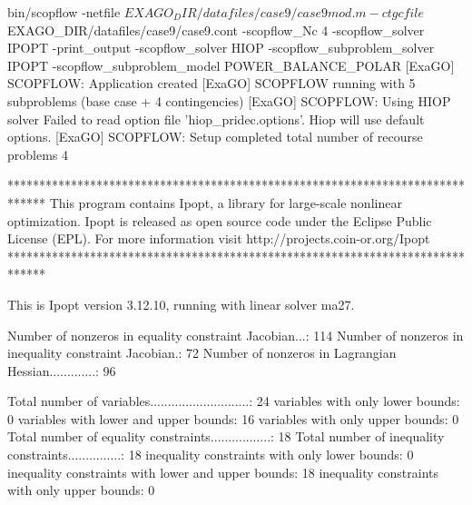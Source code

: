bin/scopflow -netfile $EXAGO_DIR/datafiles/case9/case9mod.m -ctgcfile $EXAGO_DIR/datafiles/case9/case9.cont -scopflow_Nc 4 -scopflow_solver IPOPT -print_output -scopflow_solver HIOP -scopflow_subproblem_solver IPOPT -scopflow_subproblem_model POWER_BALANCE_POLAR
[ExaGO] SCOPFLOW: Application created
[ExaGO] SCOPFLOW running with 5 subproblems (base case + 4 contingencies)
[ExaGO] SCOPFLOW: Using HIOP solver
Failed to read option file 'hiop_pridec.options'. Hiop will use default options.
[ExaGO] SCOPFLOW: Setup completed
total number of recourse problems  4

******************************************************************************
This program contains Ipopt, a library for large-scale nonlinear optimization.
 Ipopt is released as open source code under the Eclipse Public License (EPL).
         For more information visit http://projects.coin-or.org/Ipopt
******************************************************************************

This is Ipopt version 3.12.10, running with linear solver ma27.

Number of nonzeros in equality constraint Jacobian...:      114
Number of nonzeros in inequality constraint Jacobian.:       72
Number of nonzeros in Lagrangian Hessian.............:       96

Total number of variables............................:       24
                     variables with only lower bounds:        0
                variables with lower and upper bounds:       16
                     variables with only upper bounds:        0
Total number of equality constraints.................:       18
Total number of inequality constraints...............:       18
        inequality constraints with only lower bounds:        0
   inequality constraints with lower and upper bounds:       18
        inequality constraints with only upper bounds:        0

